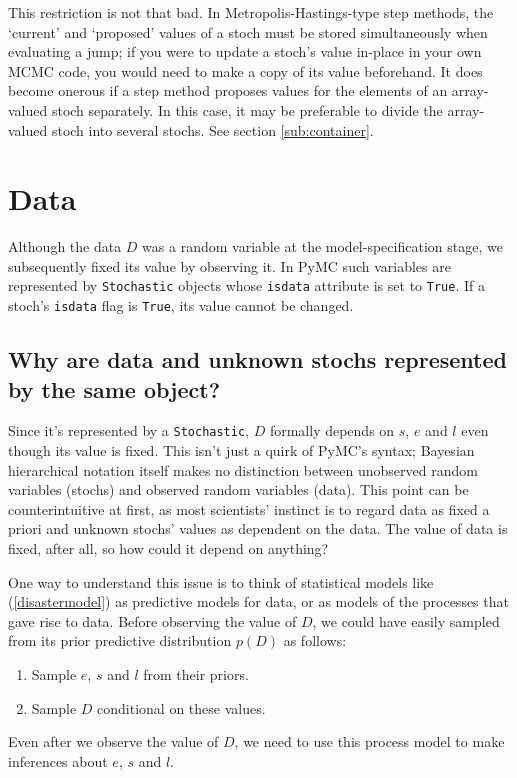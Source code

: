 This restriction is not that bad. In Metropolis-Hastings-type step methods, the `current' and `proposed' values of a stoch must be stored simultaneously when evaluating a jump; if you were to update a stoch's value in-place in your own MCMC code, you would need to make a copy of its value beforehand. It does become onerous if a step method proposes values for the elements of an array-valued stoch separately. In this case, it may be preferable to divide the array-valued stoch into several stochs. See section \ref{sub:container}. 

\section{Data}

Although the data $D$ was a random variable at the model-specification stage, we subsequently fixed its value by observing it. In PyMC such variables are represented by \texttt{Stochastic} objects whose \texttt{isdata} attribute is set to \texttt{True}. If a stoch's \texttt{isdata} flag is \texttt{True}, its value cannot be changed.

\subsection{Why are data and unknown stochs represented by the same object?}
Since it's represented by a \texttt{Stochastic}, $D$ formally depends on $s$, $e$ and $l$ even though its value is fixed. This isn't just a quirk of PyMC's syntax; Bayesian hierarchical notation itself makes no distinction between unobserved random variables (stochs) and observed random variables (data). This point can be counterintuitive at first, as most scientists' instinct is to regard data as fixed a priori and unknown stochs' values as dependent on the data. The value of data is fixed, after all, so how could it depend on anything?

One way to understand this issue is to think of statistical models like (\ref{disastermodel}) as predictive models for data, or as models of the processes that gave rise to data. Before observing the value of $D$, we could have easily sampled from its prior predictive distribution $p(D)$ as follows:
\begin{enumerate}
    \item Sample $e$, $s$ and $l$ from their priors.
    \item Sample $D$ conditional on these values.
\end{enumerate}
Even after we observe the value of $D$, we need to use this process model to make inferences about $e$, $s$ and $l$.

